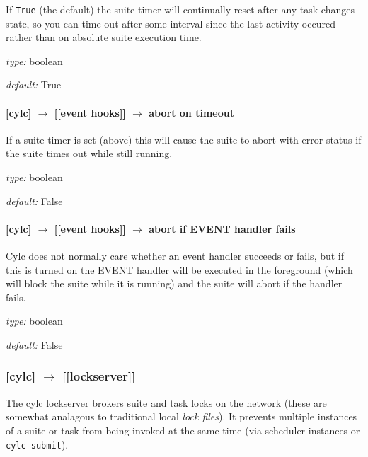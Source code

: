 If \lstinline=True= (the default) the suite timer will continually reset
after any task changes state, so you can time out after some interval
since the last activity occured rather than on absolute suite execution
time.

\begin{myitemize}
    \item {\em type:} boolean
    \item {\em default:} True
\end{myitemize}

\paragraph[abort on timeout]{[cylc] $\rightarrow$ [[event hooks]] $\rightarrow$ abort on timeout}

If a suite timer is set (above) this will cause the suite to abort with
error status if the suite times out while still running.

\begin{myitemize}
    \item {\em type:} boolean
    \item {\em default:} False
\end{myitemize}

\paragraph[abort if startup handler fails]{[cylc] $\rightarrow$ [[event hooks]] $\rightarrow$ abort if EVENT handler fails}

Cylc does not normally care whether an event handler succeeds or fails,
but if this is turned on the EVENT handler will be executed in the
foreground (which will block the suite while it is running) and the
suite will abort if the handler fails.

\begin{myitemize}
    \item {\em type:} boolean
    \item {\em default:} False
\end{myitemize}

\subsubsection[{[[}lockserver{]]}]{[cylc] $\rightarrow$ [[lockserver]]}

The cylc lockserver brokers suite and task locks on the network (these
are somewhat analagous to traditional local {\em lock files}). It
prevents multiple instances of a suite or task from being invoked 
at the same time (via scheduler instances or \lstinline=cylc submit=).
 
